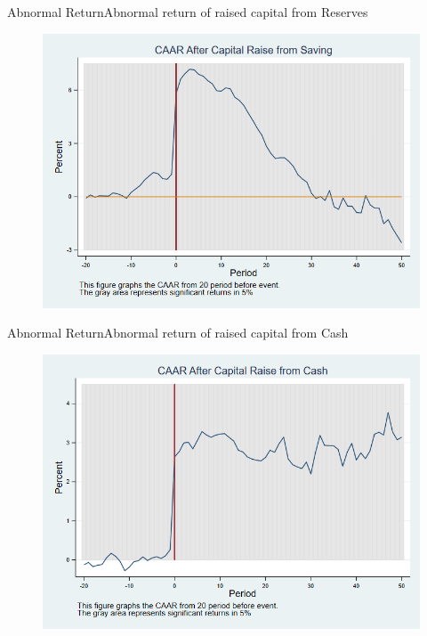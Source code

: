 \documentclass{beamer}
\begin{document}
	
	\begin{frame}{Abnormal Return}{Abnormal return of raised capital from Reserves}
		\label{car_marketmodel_industrySaving}
		\begin{figure}
			\centering
			\includegraphics[width=0.65\linewidth]{Output/car_marketmodel_industrySaving.png}
			\label{fig:car_marketmodel_industrySaving}
		\end{figure}
	\end{frame}
	
	
	\begin{frame}{Abnormal Return}{Abnormal return of raised capital from Cash}
		\label{car_marketmodel_industryCash}
		\begin{figure}
			\centering
			\includegraphics[width=0.65\linewidth]{Output/car_marketmodel_industryCash.png}
			\label{fig:car_marketmodel_industryCash}
		\end{figure}
		
	\end{frame}
	
\end{document}
